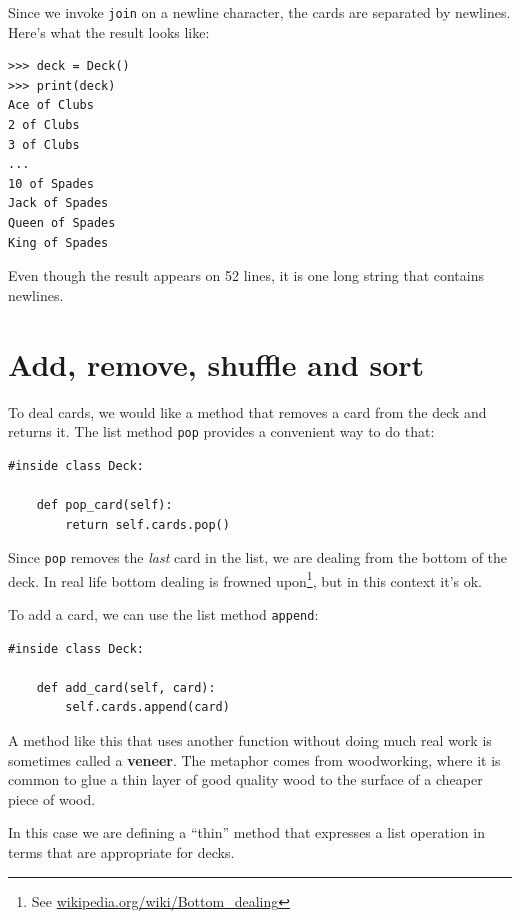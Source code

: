 \documentclass[10pt]{book}
\begin{document}

Since we invoke {\tt join} on a newline character, the cards
are separated by newlines.  Here's what the result looks like:

\beforeverb
\begin{verbatim}
>>> deck = Deck()
>>> print(deck)
Ace of Clubs
2 of Clubs
3 of Clubs
...
10 of Spades
Jack of Spades
Queen of Spades
King of Spades
\end{verbatim}
\afterverb
%
Even though the result appears on 52 lines, it is
one long string that contains newlines.


\section{Add, remove, shuffle and sort}

To deal cards, we would like a method that
removes a card from the deck and returns it.
The list method {\tt pop} provides a convenient way to do that:


\beforeverb
\begin{verbatim}
#inside class Deck:

    def pop_card(self):
        return self.cards.pop()
\end{verbatim}
\afterverb
%
Since {\tt pop} removes the {\em last} card in the list, we are
dealing from the bottom of the deck.  In real life bottom dealing is
frowned upon\footnote{See \url{wikipedia.org/wiki/Bottom_dealing}},
but in this context it's ok.


To add a card, we can use the list method {\tt append}:

\beforeverb
\begin{verbatim}
#inside class Deck:

    def add_card(self, card):
        self.cards.append(card)
\end{verbatim}
\afterverb
%
A method like this that uses another function without doing
much real work is sometimes called a {\bf veneer}.  The metaphor
comes from woodworking, where it is common to glue a thin
layer of good quality wood to the surface of a cheaper piece of
wood.


In this case we are defining a ``thin'' method that expresses
a list operation in terms that are appropriate for decks.
\end{document}
